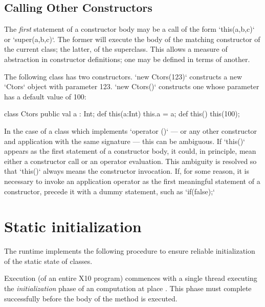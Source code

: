 \subsection{Calling Other Constructors}
\label{sect:call-another-ctor}

The {\em first} statement of a constructor body may be a call of the form 
\xcd`this(a,b,c)` or \xcd`super(a,b,c)`.  The former will execute the body of
the matching constructor of the current class; the latter, of the superclass. 
This allows a measure of abstraction in constructor definitions; one may be
defined in terms of another.

\begin{ex}
The following class has two constructors.  \xcd`new Ctors(123)` constructs a
new \xcd`Ctors` object with parameter 123.  \xcd`new Ctors()` constructs one
whose parameter has a default value of 100: 
\begin{xten}
class Ctors {
  public val a : Int;
  def this(a:Int) { this.a = a; }
  def this()      { this(100);  }
}
\end{xten}
\end{ex}

In the case of a class which implements \xcd`operator ()` 
--- or any other constructor and application with the same signature --- 
this can be ambiguous.  If \xcd`this()` appears as the first statement of a
constructor body, it could, in principle, mean either a constructor call or an
operator evaluation.   This ambiguity is resolved so that \xcd`this()` always
means the constructor invocation.  If, for some reason, it is necessary to
invoke an application operator as the first meaningful statement of a
constructor, precede it with a dummy statement, such as \xcd`if(false);`  

\section{Static initialization}
\label{StaticInitialization}
The \Xten{} runtime implements the following procedure to ensure
reliable initialization of the static state of classes.


Execution (of an entire X10 program) commences with a single thread executing
the 
\emph{initialization} phase of an \Xten{} computation at place . This
phase must complete successfully before the body of the  method is
executed.

